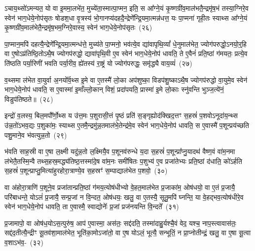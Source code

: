 ऽचाय॒थ्सो॑\-ऽमन्यत॒ यो वा इ॒ममा॒लभे॑त॒ मुच्ये॑ता॒स्मात्पा॒\-प्मन॒ इति॒ स आ᳚ग्ने॒यं कृ॒ष्ण\-ग्री॑व॒मा\-ल॑भतै॒न्द्र\-मृ॑ष॒भं तस्या॒ग्निरे॒व स्वेन॑ भाग॒\-धेये॒नोप॑सृतः षोडश॒धा वृ॒त्रस्य॑ भो॒गानप्य॑दह\-दै॒न्द्रेणे᳚न्द्रि॒य\-मा॒त्मन्न॑धत्त॒ यः पा॒प्मना॑ गृही॒तः स्याथ्स आ᳚ग्ने॒यं कृ॒ष्ण\-ग्री॑व॒मा\-ल॑भेतै॒न्द्र\-मृ॑ष॒भम॒ग्निरे॒वास्य॒ स्वेन॑ भाग॒\-धेये॒नोप॑सृतः~(२६)\ip

पा॒प्मान॒मपि॑ दहत्यै॒न्द्रेणे᳚न्द्रि॒यमा॒त्मन्ध॑त्ते॒ मुच्य॑ते पा॒प्मनो॒ भव॑त्ये॒व द्या॑वापृथि॒व्यां᳚ धे॒नुमा\-ल॑भेत॒ ज्योग॑परुद्धो॒\-ऽनयो॒र्॒\mbox{}हि वा ए॒षो\-ऽप्र॑तिष्ठि॒तो\-ऽथै॒ष ज्योगप॑रुद्धो॒ द्यावा॑\-पृथि॒वी ए॒व स्वेन॑ भाग॒\-धेये॒नोप॑ धावति॒ ते ए॒वैनं॑ प्रति॒ष्ठां ग॑मयतः॒ प्रत्ये॒व ति॑ष्ठति पर्या॒रिणी॑ भवति पर्या॒रीव॒ ह्ये॑तस्य॑ रा॒ष्ट्रं यो ज्योग॑परुद्धः॒ समृ॑द्ध्यै वाय॒व्यं॑~(२७)\ip

व॒थ्समा ल॑भेत वा॒युर्वा अ॒नयो᳚र्व॒थ्स इ॒मे वा ए॒तस्मै॑ लो॒का अप॑शुष्का॒ विडप॑शु॒ष्का\-ऽथै॒ष ज्योगप॑रुद्धो वा॒युमे॒व स्वेन॑ भाग॒\-धेये॒नोप॑ धावति॒ स ए॒वास्मा॑ इ॒माँल्लो॒कान् विशं॒ प्रदा॑पयति॒ प्रास्मा॑ इ॒मे लो॒काः स्नु॑वन्ति भुञ्ज॒त्ये॑नं॒ विडुप॑तिष्ठते॥~(२८)\ip

{\anuvakamend[{म॒ध्यन्दि॑ने॒ कद्रुं॑ य॒मस्य॒ स्पर्ध॑मानो वैष्णावरु॒णीन्तमिन्द्रो᳚\-ऽस्य॒ स्वेन॑ भाग॒\-धेये॒नोप॑सृतो वाय॒व्यं॑ द्विच॑त्वारिꣳशच्च।}]}

इन्द्रो॑ व॒लस्य॒ बिल॒मपौ᳚र्णो॒थ्स य उ॑त्त॒मः प॒शुरासी॒त्तं पृ॒ष्ठं प्रति॑ स॒ङ्गृह्योद॑क्खिद॒त्तꣳ स॒हस्रं॑ प॒शवो\-ऽनूदा॑य॒न्थ्स उ॑न्न॒तो॑\-ऽभव॒द्यः प॒शुका॑मः॒ स्याथ्स ए॒तमै॒न्द्रमु॑न्न॒तमाल॑भे॒तेन्द्र॑मे॒व स्वेन॑ भाग॒\-धेये॒नोप॑ धावति॒ स ए॒वास्मै॑ प॒शून्प्रय॑च्छति पशु॒माने॒व भ॑वत्युन्न॒तो~(२९)\ip

भ॑वति साह॒स्री वा ए॒षा ल॒क्ष्मी यदु॑न्न॒तो ल॒क्ष्मियै॒व प॒शूनव॑\-रुन्धे य॒दा स॒हस्रं॑ प॒शून्प्रा᳚प्नु॒यादथ॑ वैष्ण॒वं वा॑म॒नमा ल॑भेतै॒तस्मि॒न्वै तथ्स॒हस्र॒मद्ध्य॑तिष्ठ॒त्तस्मा॑दे॒ष वा॑म॒नः समी॑षितः प॒शुभ्य॑ ए॒व प्रजा॑तेभ्यः प्रति॒ष्ठां द॑धाति॒ को॑\-ऽर्\mbox{}हति स॒हस्रं॑ प॒शून्प्राप्तु॒मित्या॑हुरहोरा॒त्राण्ये॒व स॒हस्रꣳ॑ स॒म्पाद्याल॑भेत प॒शवो॒~(३०)\ip

वा अ॑होरा॒त्राणि॑ प॒शूने॒व प्रजा॑तान्प्रति॒ष्ठां ग॑मय॒त्योष॑धीभ्यो वे॒हत॒माल॑भेत प्र॒जाका॑म॒ ओष॑धयो॒ वा ए॒तं प्र॒जायै॒ परि॑बाधन्ते॒ यो\-ऽलं॑ प्र॒जायै॒ सन्प्र॒जां न वि॒न्दत॒ ओष॑धयः॒ खलु॒ वा ए॒तस्यै॒ सूतु॒मपि॑ घ्नन्ति॒ या वे॒हद्भव॒त्योष॑धीरे॒व स्वेन॑ भाग॒\-धेये॒नोप॑ धावति॒ ता ए॒वास्मै॒ स्वाद्योनेः᳚ प्र॒जां प्रज॑नयन्ति वि॒न्दते᳚~(३१)\ip

प्र॒जामापो॒ वा ओष॑ध॒यो\-ऽस॒त्पुरु॑ष॒ आप॑ ए॒वास्मा॒ अस॑तः॒ सद्द॑दति॒ तस्मा॑दाहु॒र्यश्चै॒वं वेद॒ यश्च॒ नाप॒स्त्वावास॑तः॒ सद्द॑द॒तीत्यै॒न्द्रीꣳ सू॒तव॑शा॒मा\-ल॑भेत॒ भूति॑का॒मो\-ऽजा॑तो॒ वा ए॒ष यो\-ऽलं॒ भूत्यै॒ सन्भूतिं॒ न प्रा॒प्नोतीन्द्रं॒ खलु॒ वा ए॒षा सू॒त्वा व॒शा\-ऽभ॑व॒-~(३२)\ip

